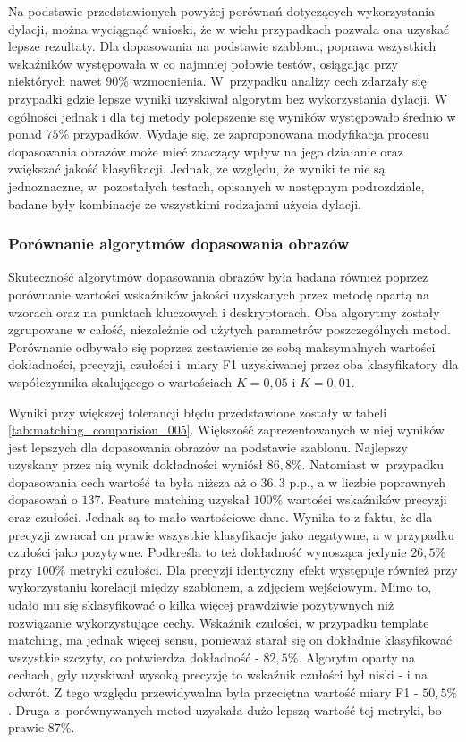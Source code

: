 

Na podstawie przedstawionych powyżej porównań dotyczących wykorzystania dylacji, można wyciągnąć wnioski, że w wielu przypadkach pozwala ona uzyskać lepsze rezultaty. Dla dopasowania na podstawie szablonu, poprawa wszystkich wskaźników występowała w co najmniej połowie testów, osiągając przy niektórych nawet $90\%$ wzmocnienia. W~przypadku analizy cech zdarzały się przypadki gdzie lepsze wyniki uzyskiwał algorytm bez wykorzystania dylacji. W ogólności jednak i dla tej metody polepszenie się wyników występowało średnio w ponad $75\%$ przypadków. Wydaje się, że zaproponowana modyfikacja procesu dopasowania obrazów może mieć znaczący wpływ na jego działanie oraz zwiększać jakość klasyfikacji. Jednak, ze względu, że wyniki te nie są jednoznaczne, w~pozostałych testach, opisanych w następnym podrozdziale, badane były kombinacje ze wszystkimi rodzajami użycia dylacji. 


\subsubsection{Porównanie algorytmów dopasowania obrazów} \label{sec:test_template_feature}

Skuteczność algorytmów dopasowania obrazów była badana również poprzez porównanie wartości wskaźników jakości uzyskanych przez metodę opartą na wzorach oraz na punktach kluczowych i deskryptorach. Oba algorytmy zostały zgrupowane w całość, niezależnie od użytych parametrów poszczególnych metod. Porównanie odbywało się poprzez zestawienie ze sobą maksymalnych wartości dokładności, precyzji, czułości i~miary F1 uzyskiwanej przez oba klasyfikatory dla współczynnika skalującego o wartościach $K=0,05$ i $K=0,01$. 

Wyniki przy większej tolerancji błędu przedstawione zostały w tabeli \ref{tab:matching_comparision_005}. Większość zaprezentowanych w niej wyników jest lepszych dla dopasowania obrazów na podstawie szablonu. Najlepszy uzyskany przez nią wynik dokładności wyniósł $86,8\%$. Natomiast w~przypadku dopasowania cech wartość ta była niższa aż o $36,3$ p.p., a w liczbie poprawnych dopasowań o $137$. Feature matching uzyskał $100\%$ wartości wskaźników precyzji oraz czułości. Jednak są to mało wartościowe dane. Wynika to z faktu, że dla precyzji zwracał on prawie wszystkie klasyfikacje jako negatywne, a w przypadku czułości jako pozytywne. Podkreśla to też dokładność wynosząca jedynie $26,5\%$ przy $100\%$ metryki czułości. Dla precyzji identyczny efekt występuje również przy wykorzystaniu korelacji między szablonem, a zdjęciem wejściowym. Mimo to, udało mu się sklasyfikować o kilka więcej prawdziwie pozytywnych niż rozwiązanie wykorzystujące cechy. Wskaźnik czułości, w przypadku template matching, ma jednak więcej sensu, ponieważ starał się on dokładnie klasyfikować wszystkie szczyty, co potwierdza dokładność - $82,5\%$. Algorytm oparty na cechach, gdy uzyskiwał wysoką precyzję to wskaźnik czułości był niski - i na odwrót. Z tego względu przewidywalna była przeciętna wartość miary F1 - $50,5\%$. Druga z~porównywanych metod uzyskała dużo lepszą wartość tej metryki, bo prawie $87\%$.

